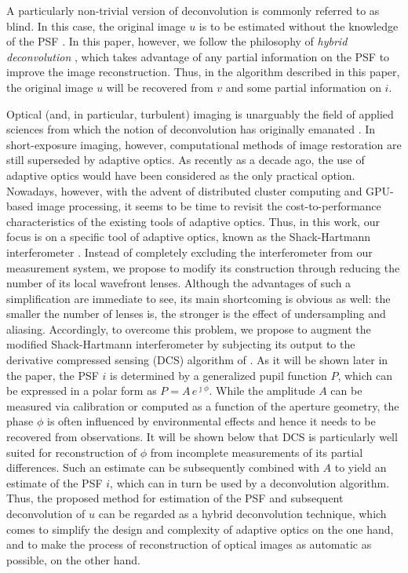 \pdfoutput=1 \documentclass[journal]{IEEEtran}
\begin{document}
A particularly non-trivial version of deconvolution is commonly referred to as blind. In this case, the original image $u$ is to be estimated without the knowledge of the PSF \cite{42}. In this paper, however, we follow the philosophy of {\em hybrid deconvolution} \cite{Oleg07}, which takes advantage of any partial information on the PSF to improve the image reconstruction. Thus, in the algorithm described in this paper, the original image $u$ will be recovered from $v$ and some partial information on $i$.

Optical (and, in particular, turbulent) imaging is unarguably the field of applied sciences from which the notion of deconvolution has originally emanated \cite{Richardson72, Lucy74, 44}. In short-exposure imaging, however, computational methods of image restoration are still superseded by adaptive optics. As recently as a decade ago, the use of adaptive optics would have been considered as the only practical option. Nowadays, however, with the advent of distributed cluster computing and GPU-based image processing, it seems to be time to revisit the cost-to-performance characteristics of the existing tools of adaptive optics. Thus, in this work, our focus is on a specific tool of adaptive optics, known as the Shack-Hartmann interferometer \cite{12, 18}. Instead of completely excluding the interferometer from our measurement system, we propose to  modify its construction through reducing the number of its local wavefront lenses. Although the advantages of such a simplification are immediate to see, its main shortcoming is obvious as well: the smaller the number of lenses is, the stronger is the effect of undersampling and aliasing. Accordingly, to overcome this problem, we propose to augment the modified Shack-Hartmann interferometer by subjecting its output to the derivative compressed sensing (DCS) algorithm of \cite{14}. As it will be shown later in the paper, the PSF $i$ is determined by a generalized pupil function $P$, which can be expressed in a polar form as $P = A \, e^{\jmath \phi}$. While the amplitude $A$ can be measured via calibration or computed as a function of the aperture geometry, the phase $\phi$ is often influenced by environmental effects and hence it needs to be recovered from observations. It will be shown below that DCS is particularly well suited for reconstruction of $\phi$ from incomplete measurements of its partial differences. Such an estimate can be subsequently combined with $A$ to yield an estimate of the PSF $i$, which can in turn be used by a deconvolution algorithm. Thus, the proposed method for estimation of the PSF and subsequent deconvolution of $u$ can be regarded as a hybrid deconvolution technique, which comes to simplify the design and complexity of adaptive optics on the one hand, and to make the process of reconstruction of optical images as automatic as possible, on the other hand.
\end{document}

